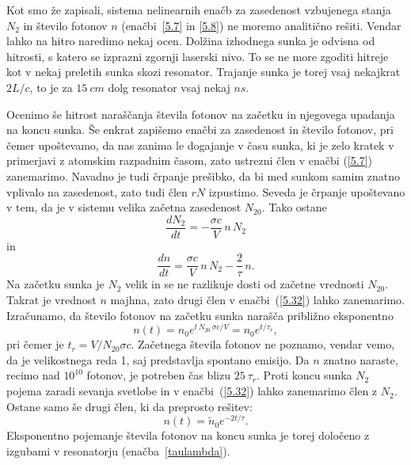 Kot smo že zapisali, sistema nelinearnih enačb za zasedenost vzbujenega stanja $N_2$ 
in število fotonov $n$
(enačbi~\ref{5.7} in \ref{5.8}) ne moremo analitično rešiti. Vendar lahko na hitro
naredimo nekaj ocen. Dolžina izhodnega sunka je odvisna od hitrosti, 
s katero se izprazni zgornji laserski nivo. To se ne more zgoditi
hitreje kot v nekaj preletih sunka skozi resonator. Trajanje sunka je torej
vsaj nekajkrat $2L/c$, to je za $15~\si{cm}$ dolg resonator vsaj nekaj $\si{ns}$.

Ocenimo še hitrost naraščanja števila fotonov na začetku in 
njegovega upadanja na koncu sunka. Še enkrat zapišemo enačbi za zasedenost in število
fotonov, pri čemer upoštevamo, da nas zanima le dogajanje v času sunka,
ki je zelo kratek v primerjavi z atomskim razpadnim časom, zato 
ustrezni člen v enačbi (\ref{5.7}) zanemarimo. Navadno je tudi črpanje prešibko, da
bi med sunkom samim znatno vplivalo na zasedenost, zato tudi člen $rN$
izpustimo. Seveda je črpanje upoštevano v tem, da je v sistemu velika začetna 
zasedenost $N_{20}$. Tako ostane 
\begin{equation}
 \frac{d N_2}{d t}=-\frac{\sigma c}{V}\,n\,N_2 
 \label{5.32a}
\end{equation}
in 
\begin{equation}
 \frac{d n}{d t}=\frac{\sigma c}{V}\,n\,N_2 - \frac{2}{\tau}\,n.
 \label{5.32}
\end{equation}
Na začetku sunka je $N_2$ velik in se ne razlikuje dosti od začetne vrednosti $N_{20}$. Takrat 
je vrednost  $n$ majhna, zato drugi člen v enačbi~(\ref{5.32}) lahko  
zanemarimo. Izračunamo, da število fotonov
na začetku sunka narašča približno eksponentno
\begin{equation}  
n(t)=n_0e^{t\,N_{20}\,\sigma c/V}= n_0e^{t/\tau_r},
\label{5.33}
\end{equation}
pri čemer je $t_r = V/N_{20} \sigma c$.
Začetnega števila fotonov ne poznamo, vendar vemo, da je velikostnega reda 1,
saj predstavlja spontano emisijo. Da $n$ znatno naraste, recimo nad 
$10^{10}$ fotonov, je potreben čas blizu $25~\tau_r$.
Proti koncu sunka $N_2$ pojema zaradi sevanja svetlobe in v enačbi~(\ref{5.32}) lahko 
zanemarimo člen z $N_2$. Ostane samo še drugi člen, ki da preprosto rešitev:
\begin{equation}  
n(t)=\tilde{n}_0e^{-2t/\tau}.
\label{5.33a}
\end{equation}
Eksponentno pojemanje števila fotonov na koncu sunka je torej določeno z izgubami
v resonatorju (enačba~\ref{taulambda}). 


